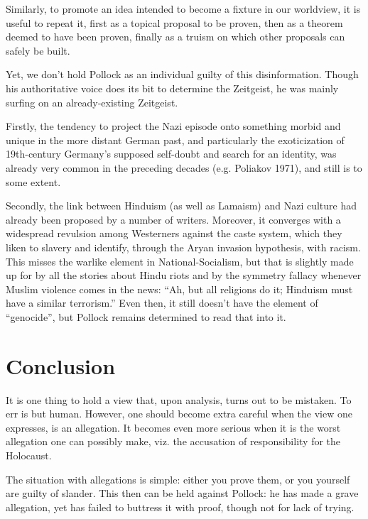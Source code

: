 Similarly, to promote an idea intended to become a fixture in our worldview, it is useful to repeat it, first as a topical proposal to be proven, then as a theorem deemed to have been proven, finally as a truism on which other proposals can safely be built.

Yet, we don’t hold Pollock as an individual guilty of this disinformation. Though his authoritative voice does its bit to determine the Zeitgeist, he was mainly surfing on an already-existing Zeitgeist.

Firstly, the tendency to project the Nazi episode onto something morbid and unique in the more distant German past, and particularly the exoticization of 19th-century Germany’s supposed self-doubt and search for an identity, was already very common in the preceding decades (e.g. Poliakov 1971), and still is to some extent.

Secondly, the link between Hinduism (as well as Lamaism) and Nazi culture had already been proposed by a number of writers. Moreover, it converges with a widespread revulsion among Westerners against the caste system, which they liken to slavery and identify, through the Aryan invasion hypothesis, with racism. This misses the warlike element in National-Socialism, but that is slightly made up for by all the stories about Hindu riots and by the symmetry fallacy whenever Muslim violence comes in the news: “Ah, but all religions do it; Hinduism must have a similar terrorism.” Even then, it still doesn’t have the element of “genocide”, but Pollock remains determined to read that into it.

\section*{Conclusion}

It is one thing to hold a view that, upon analysis, turns out to be mistaken. To err is but human. However, one should become extra careful when the view one expresses, is an allegation. It becomes even more serious when it is the worst allegation one can possibly make, viz. the accusation of responsibility for the Holocaust.

The situation with allegations is simple: either you prove them, or you yourself are guilty of slander. This then can be held against Pollock: he has made a grave allegation, yet has failed to buttress it with proof, though not for lack of trying.

